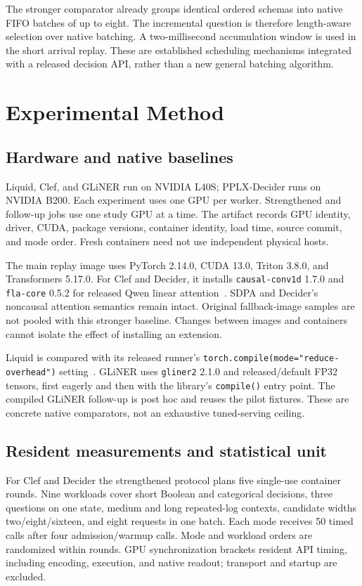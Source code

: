 \documentclass[10pt,twocolumn]{article}
\begin{document}
The stronger comparator already groups identical ordered schemas into native FIFO batches of up to eight. The incremental question is therefore length-aware selection over native batching. A two-millisecond accumulation window is used in the short arrival replay. These are established scheduling mechanisms integrated with a released decision API, rather than a new general batching algorithm.

\section{Experimental Method}
\subsection{Hardware and native baselines}
Liquid, Clef, and GLiNER run on NVIDIA L40S; PPLX-Decider runs on NVIDIA B200. Each experiment uses one GPU per worker. Strengthened and follow-up jobs use one study GPU at a time. The artifact records GPU identity, driver, CUDA, package versions, container identity, load time, source commit, and mode order. Fresh containers need not use independent physical hosts.

The main replay image uses PyTorch 2.14.0, CUDA 13.0, Triton 3.8.0, and Transformers 5.17.0. For Clef and Decider, it installs \texttt{causal-conv1d} 1.7.0 and \texttt{fla-core} 0.5.2 for released Qwen linear attention~\citep{qwenkernels}. SDPA and Decider's noncausal attention semantics remain intact. Original fallback-image samples are not pooled with this stronger baseline. Changes between images and containers cannot isolate the effect of installing an extension.

Liquid is compared with its released runner's \texttt{torch.compile(mode="reduce-overhead")} setting~\citep{torchcompile}. GLiNER uses \texttt{gliner2} 2.1.0 and released/default FP32 tensors, first eagerly and then with the library's \texttt{compile()} entry point. The compiled GLiNER follow-up is post hoc and reuses the pilot fixtures. These are concrete native comparators, not an exhaustive tuned-serving ceiling.

\subsection{Resident measurements and statistical unit}
For Clef and Decider the strengthened protocol plans five single-use container rounds. Nine workloads cover short Boolean and categorical decisions, three questions on one state, medium and long repeated-log contexts, candidate widths two/eight/sixteen, and eight requests in one batch. Each mode receives 50 timed calls after four admission/warmup calls. Mode and workload orders are randomized within rounds. GPU synchronization brackets resident API timing, including encoding, execution, and native readout; transport and startup are excluded.
\end{document}
